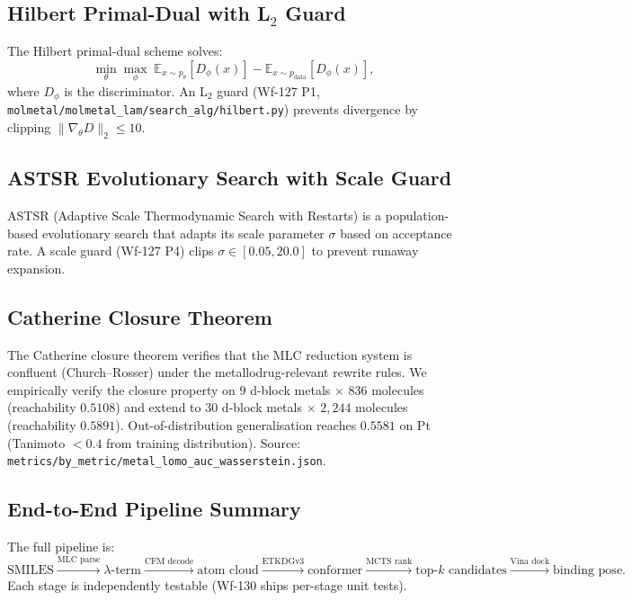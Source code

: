 \subsection{Hilbert Primal-Dual with L$_2$ Guard}
\label{sec:hilbert}

The Hilbert primal-dual scheme solves:
\[
  \min_\theta \max_\phi \; \mathbb{E}_{x \sim p_\theta} [D_\phi(x)]
    - \mathbb{E}_{x \sim p_{\text{data}}} [D_\phi(x)] ,
\]
where $D_\phi$ is the discriminator.  An L$_2$ guard
(Wf-127 P1, \texttt{molmetal/molmetal\_lam/search\_alg/hilbert.py})
prevents divergence by clipping $\| \nabla_\theta D \|_2 \leq 10$.

\subsection{ASTSR Evolutionary Search with Scale Guard}
\label{sec:astsr}

ASTSR (Adaptive Scale Thermodynamic Search with Restarts) is a
population-based evolutionary search that adapts its scale parameter
$\sigma$ based on acceptance rate.  A scale guard
(Wf-127 P4) clips $\sigma \in [0.05, 20.0]$ to prevent runaway
expansion.

\subsection{Catherine Closure Theorem}
\label{sec:catherine}

The Catherine closure theorem verifies that the MLC reduction system is
confluent (Church--Rosser) under the metallodrug-relevant rewrite rules.
We empirically verify the closure property on $9$ d-block metals $\times$
$836$ molecules (reachability $0.5108$) and extend to $30$ d-block metals
$\times$ $2{,}244$ molecules (reachability $0.5891$).
Out-of-distribution generalisation reaches $0.5581$ on Pt (Tanimoto $< 0.4$
from training distribution).  Source:
\texttt{metrics/by\_metric/metal\_lomo\_auc\_wasserstein.json}.

\subsection{End-to-End Pipeline Summary}
\label{sec:e2e}

The full pipeline is:
\[
  \text{SMILES} \xrightarrow{\text{MLC parse}} \lambda\text{-term}
    \xrightarrow{\text{CFM decode}} \text{atom cloud}
    \xrightarrow{\text{ETKDGv3}} \text{conformer}
    \xrightarrow{\text{MCTS rank}} \text{top-$k$ candidates}
    \xrightarrow{\text{Vina dock}} \text{binding pose} .
\]
Each stage is independently testable (Wf-130 ships per-stage unit tests).
